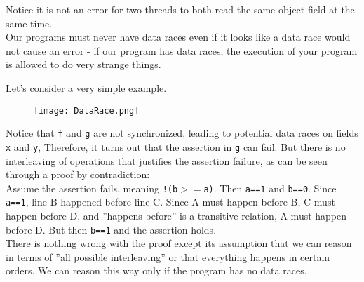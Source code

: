 \documentclass[main]{subfiles}
\begin{document}
\noindent Notice it is not an error for two threads to both read the same object field at the same time.\\[3mm]
Our programs must never have data races even if it looks like a data race would not cause an error - if our program has data races, the execution of your program is allowed to do very strange things.
\begin{example}
    Let's consider a very simple example.
    \begin{figure}[H]
        \centering
        \texttt{[image: DataRace.png]}
    \end{figure}
    Notice that \texttt{f} and \texttt{g} are not synchronized, leading to potential data races on fields \texttt{x} and \texttt{y}, Therefore, it turns out that the assertion in \texttt{g} can fail. But there is no interleaving of operations that justifies the assertion failure, as can be seen through a proof by contradiction: \\[3mm]
    \quad Assume the assertion fails, meaning \texttt{!(b$>=$a)}. Then \texttt{a==1} and \texttt{b==0}. Since \texttt{a==1}, line B happened before line C. Since A must happen before B, C must happen before D, and ''happens before'' is a transitive relation, A must happen before D. But then \texttt{b==1} and the assertion holds.\\[3mm]
    There is nothing wrong with the proof except its assumption that we can reason in terms of ''all possible interleaving'' or that everything happens in certain orders. We can reason this way only if the program has no data races.
\end{example}
\end{document}
